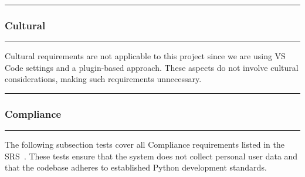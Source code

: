\documentclass[12pt, titlepage]{article}
\newcommand{\colorrule}{\textcolor{BlueViolet}{\rule{\linewidth}{2pt}}}
\begin{document}
  \noindent
  \colorrule

  \subsubsection{Cultural}
  \colorrule

  \medskip

  \noindent
  Cultural requirements are not applicable to this project since we
  are using VS Code settings and a plugin-based approach. These
  aspects do not involve cultural considerations, making such
  requirements unnecessary.

  \newpage
  \noindent
  \colorrule

\subsubsection{Compliance}
\colorrule

\medskip

\noindent
The following subsection tests cover all Compliance requirements listed in the SRS~\cite{SRS}. These tests ensure that the system does not collect personal user data and that the codebase adheres to established Python development standards.
\end{document}
